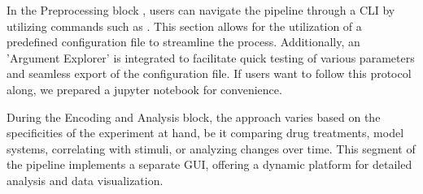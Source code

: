 In the Preprocessing block , users can navigate the pipeline through a \ac{CLI} by utilizing commands such as . This section allows for the utilization of a predefined configuration file to streamline the process. Additionally, an 'Argument Explorer' is integrated to facilitate quick testing of various parameters and seamless export of the configuration file. If users want to follow this protocol along, we prepared a jupyter notebook for convenience.

During the Encoding and Analysis block, the approach varies based on the specificities of the experiment at hand, be it comparing drug treatments, model systems, correlating with stimuli, or analyzing changes over time. This segment of the pipeline implements a separate GUI, offering a dynamic platform for detailed analysis and data visualization.

